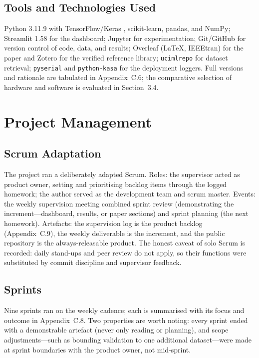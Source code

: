 \documentclass[11pt,a4paper]{article}
\begin{document}
\subsection{Tools and Technologies Used}
Python 3.11.9 with TensorFlow/Keras \cite{abadi2016tensorflow}, scikit-learn,
pandas, and NumPy; Streamlit 1.58 for the dashboard; Jupyter for
experimentation; Git/GitHub for version control of code, data, and results;
Overleaf (\LaTeX, IEEEtran) for the paper and Zotero for the verified reference
library; \texttt{ucimlrepo} for dataset retrieval; \texttt{pyserial} and
\texttt{python-kasa} for the deployment loggers. Full versions and rationale are
tabulated in Appendix~C.6; the comparative selection of hardware and software is
evaluated in Section~3.4.

\section{Project Management}

\subsection{Scrum Adaptation}
The project ran a deliberately adapted Scrum. Roles: the supervisor acted as
product owner, setting and prioritising backlog items through the logged
homework; the author served as the development team and scrum master. Events:
the weekly supervision meeting combined sprint review (demonstrating the
increment---dashboard, results, or paper sections) and sprint planning (the next
homework). Artefacts: the supervision log is the product backlog
(Appendix~C.9), the weekly deliverable is the increment, and the public
repository is the always-releasable product. The honest caveat of solo Scrum is
recorded: daily stand-ups and peer review do not apply, so their functions were
substituted by commit discipline and supervisor feedback.

\subsection{Sprints}
Nine sprints ran on the weekly cadence; each is summarised with its focus and
outcome in Appendix~C.8. Two properties are worth noting: every sprint ended
with a demonstrable artefact (never only reading or planning), and scope
adjustments---such as bounding validation to one additional dataset---were made
at sprint boundaries with the product owner, not mid-sprint.
\end{document}
